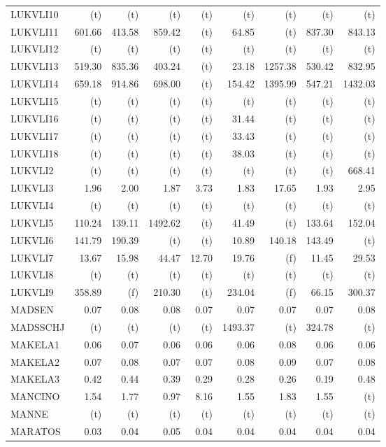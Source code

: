 \documentclass[11pt,twoside]{article}
\begin{document}
{\begin{longtable}[c]{|l|r|r|r|r|r|r|r|r|}
LUKVLI10 & (t) & (t) & (t) & (t) & (t) & (t) & (t) & (t) \\
LUKVLI11 & 601.66 & 413.58 & 859.42 & (t) & 64.85 & (t) & 837.30 & 843.13 \\
LUKVLI12 & (t) & (t) & (t) & (t) & (t) & (t) & (t) & (t) \\
LUKVLI13 & 519.30 & 835.36 & 403.24 & (t) & 23.18 & 1257.38 & 530.42 & 832.95 \\
LUKVLI14 & 659.18 & 914.86 & 698.00 & (t) & 154.42 & 1395.99 & 547.21 & 1432.03 \\
LUKVLI15 & (t) & (t) & (t) & (t) & (t) & (t) & (t) & (t) \\
LUKVLI16 & (t) & (t) & (t) & (t) & 31.44 & (t) & (t) & (t) \\
LUKVLI17 & (t) & (t) & (t) & (t) & 33.43 & (t) & (t) & (t) \\
LUKVLI18 & (t) & (t) & (t) & (t) & 38.03 & (t) & (t) & (t) \\
LUKVLI2 & (t) & (t) & (t) & (t) & (t) & (t) & (t) & 668.41 \\
LUKVLI3 & 1.96 & 2.00 & 1.87 & 3.73 & 1.83 & 17.65 & 1.93 & 2.95 \\
LUKVLI4 & (t) & (t) & (t) & (t) & (t) & (t) & (t) & (t) \\
LUKVLI5 & 110.24 & 139.11 & 1492.62 & (t) & 41.49 & (t) & 133.64 & 152.04 \\
LUKVLI6 & 141.79 & 190.39 & (t) & (t) & 10.89 & 140.18 & 143.49 & (t) \\
LUKVLI7 & 13.67 & 15.98 & 44.47 & 12.70 & 19.76 & (f) & 11.45 & 29.53 \\
LUKVLI8 & (t) & (t) & (t) & (t) & (t) & (t) & (t) & (t) \\
LUKVLI9 & 358.89 & (f) & 210.30 & (t) & 234.04 & (f) & 66.15 & 300.37 \\
MADSEN & 0.07 & 0.08 & 0.08 & 0.07 & 0.07 & 0.07 & 0.07 & 0.08 \\
MADSSCHJ & (t) & (t) & (t) & (t) & 1493.37 & (t) & 324.78 & (t) \\
MAKELA1 & 0.06 & 0.07 & 0.06 & 0.06 & 0.06 & 0.08 & 0.06 & 0.06 \\
MAKELA2 & 0.07 & 0.08 & 0.07 & 0.07 & 0.08 & 0.09 & 0.07 & 0.08 \\
MAKELA3 & 0.42 & 0.44 & 0.39 & 0.29 & 0.28 & 0.26 & 0.19 & 0.48 \\
MANCINO & 1.54 & 1.77 & 0.97 & 8.16 & 1.55 & 1.83 & 1.55 & (t) \\
MANNE & (t) & (t) & (t) & (t) & (t) & (t) & (t) & (t) \\
MARATOS & 0.03 & 0.04 & 0.05 & 0.04 & 0.04 & 0.04 & 0.04 & 0.04 \\

\end{longtable}}
\end{document}
